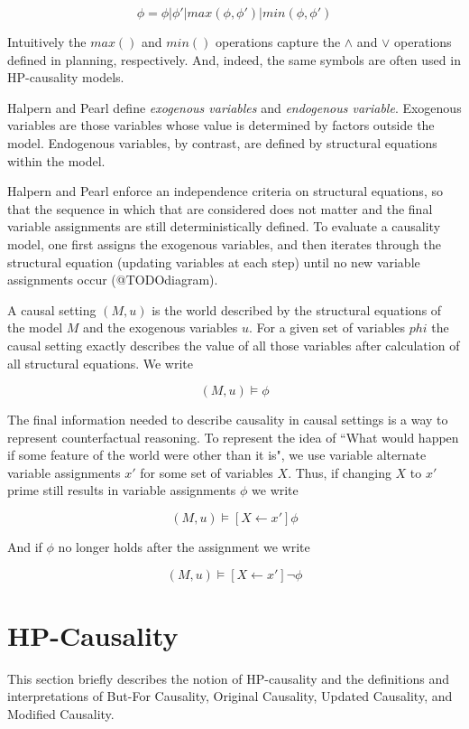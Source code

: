 \documentclass{article}
\theoremstyle{plain}
\theoremstyle{definition}
\begin{document}
\[
\phi= \phi | \phi' | max(\phi, \phi') | min(\phi, \phi') 
\]

Intuitively the $max()$ and $min()$ operations capture the $\land$ and $\lor$ operations defined in planning, respectively. And, indeed, the same symbols are often used in HP-causality models.

Halpern and Pearl define \textit{exogenous variables} and \textit{endogenous variable}. Exogenous variables are those variables whose value is determined by factors outside the model. Endogenous variables, by contrast, are defined by structural equations within the model.

Halpern and Pearl enforce an independence criteria on structural equations, so that the sequence in which that are considered does not matter and the final variable assignments are still deterministically defined. To evaluate a causality model, one first assigns the exogenous variables, and then iterates through the structural equation (updating variables at each step) until no new variable assignments occur (@TODOdiagram).

A causal setting $(M,u)$ is the world described by the structural equations of the model $M$ and the exogenous variables $u$. For a given set of variables $phi$ the causal setting exactly describes the value of all those variables after calculation of all structural equations. We write

\[
(M,u) \models \phi
\]

The final information needed to describe causality in causal settings is a way to represent counterfactual reasoning. To represent the idea of ``What would happen if some feature of the world were other than it is", we use variable alternate variable assignments $x'$ for some set of variables $X$. Thus, if changing $X$ to $x'$ prime still results in variable assignments $\phi$ we write

\[
(M,u)\models [X\leftarrow x']\phi
\]

And if $\phi$ no longer holds after the assignment we write

\[
(M,u)\models [X\leftarrow x']\lnot \phi
\]

\section{HP-Causality}
This section briefly describes the notion of HP-causality and the definitions and interpretations of But-For Causality, Original Causality, Updated Causality, and Modified Causality.
\end{document}
